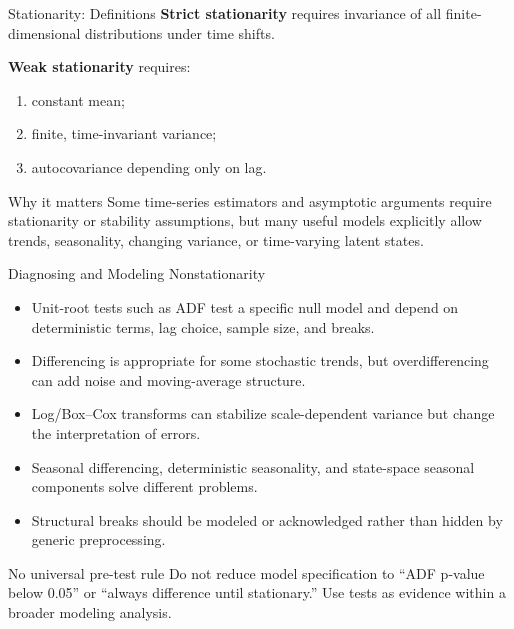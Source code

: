 \begin{frame}{Stationarity: Definitions}
\textbf{Strict stationarity} requires invariance of all finite-dimensional distributions under time shifts.

\textbf{Weak stationarity} requires:
\begin{enumerate}
  \item constant mean;
  \item finite, time-invariant variance;
  \item autocovariance depending only on lag.
\end{enumerate}

\begin{block}{Why it matters}
Some time-series estimators and asymptotic arguments require stationarity or stability assumptions, but many useful models explicitly allow trends, seasonality, changing variance, or time-varying latent states.
\end{block}
\end{frame}

\begin{frame}{Diagnosing and Modeling Nonstationarity}
\begin{itemize}
  \item Unit-root tests such as ADF test a specific null model and depend on deterministic terms, lag choice, sample size, and breaks.
  \item Differencing is appropriate for some stochastic trends, but overdifferencing can add noise and moving-average structure.
  \item Log/Box--Cox transforms can stabilize scale-dependent variance but change the interpretation of errors.
  \item Seasonal differencing, deterministic seasonality, and state-space seasonal components solve different problems.
  \item Structural breaks should be modeled or acknowledged rather than hidden by generic preprocessing.
\end{itemize}

\begin{alertblock}{No universal pre-test rule}
Do not reduce model specification to ``ADF p-value below 0.05'' or ``always difference until stationary.'' Use tests as evidence within a broader modeling analysis.
\end{alertblock}
\end{frame}

